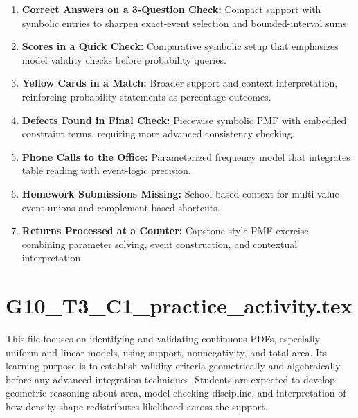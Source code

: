 \begin{enumerate}
  \item \textbf{Correct Answers on a 3-Question Check:} Compact support with symbolic entries to sharpen exact-event selection and bounded-interval sums.
  \item \textbf{Scores in a Quick Check:} Comparative symbolic setup that emphasizes model validity checks before probability queries.
  \item \textbf{Yellow Cards in a Match:} Broader support and context interpretation, reinforcing probability statements as percentage outcomes.
  \item \textbf{Defects Found in Final Check:} Piecewise symbolic PMF with embedded constraint terms, requiring more advanced consistency checking.
  \item \textbf{Phone Calls to the Office:} Parameterized frequency model that integrates table reading with event-logic precision.
  \item \textbf{Homework Submissions Missing:} School-based context for multi-value event unions and complement-based shortcuts.
  \item \textbf{Returns Processed at a Counter:} Capstone-style PMF exercise combining parameter solving, event construction, and contextual interpretation.
\end{enumerate}

\section{G10\_T3\_C1\_practice\_activity.tex}
This file focuses on identifying and validating continuous PDFs, especially uniform and linear models, using support, nonnegativity, and total area. Its learning purpose is to establish validity criteria geometrically and algebraically before any advanced integration techniques. Students are expected to develop geometric reasoning about area, model-checking discipline, and interpretation of how density shape redistributes likelihood across the support.

